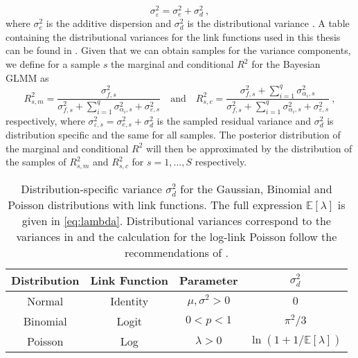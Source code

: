 \begin{equation}
    \sigma_{\varepsilon}^2 = \sigma^2_e + \sigma^2_d \ ,
\end{equation}
where $\sigma^2_e$ is the additive dispersion and $\sigma^2_d$ is the distributional variance \citep{nakagawa2013general}. A table containing the distributional variances for the link functions used in this thesis can be found in . Given that we can obtain samples for the variance components, we define for a sample $s$ the marginal and conditional $R^2$ for the Bayesian GLMM as
\begin{equation}
    \label{eq:R2_Bayes_GLMM}
    R^2_{s, m} = \frac{\sigma_{f, s}^2}{\sigma_{f, s}^2 + \sum_{i=1}^q \sigma_{\alpha_i, s}^2 + \sigma_{\varepsilon, s}^2} \quad \text{and} \quad R^2_{s, c} = \frac{\sigma_{f, s}^2 + \sum_{i=1}^q \sigma_{\alpha_i, s}^2}{\sigma_{f, s}^2 + \sum_{i=1}^q \sigma_{\alpha_i, s}^2 + \sigma_{\varepsilon, s}^2} \ ,
\end{equation}
respectively, where $\sigma_{\varepsilon, s}^2 = \sigma^2_{e, s} + \sigma^2_d$ is the sampled residual variance and $\sigma^2_d$ is distribution specific and the same for all samples. The posterior distribution of the marginal and conditional $R^2$ will then be approximated by the distribution of the samples of $R^2_{s, m}$ and $R^2_{s, c}$ for $s=1, ..., S$ respectively.

\begin{table}[h]
    \centering
    \begin{tabular}{|c|c|c|c|}
    \hline
    \textbf{Distribution} &  \textbf{Link Function} & \textbf{Parameter} & \(\sigma^2_d\) \\
    \hline
    Normal & Identity & $\mu, \sigma^2 > 0$ & $0$ \\
    \hline
    Binomial & Logit & $0<p<1$ & \(\pi^2/3\) \\
    \hline
    Poisson & Log & $\lambda>0$ & $\ln(1 + 1/\mathbb{E}[\lambda])$ \\%
    \hline
    \end{tabular}
    \caption[Distribution-specific variance \(\sigma^2_d\) for the Gaussian, Binomial and Poisson distributions]{Distribution-specific variance \(\sigma^2_d\) for the Gaussian, Binomial and Poisson distributions with link functions. The full expression $\mathbb{E}[\lambda]$ is given in \eqref{eq:lambda}. Distributional variances correspond to the variances in \citet{nakagawa2013general} and the calculation for the log-link Poisson follow the recommendations of \citet{nakagawa2017}.}
    \label{table:1}
\end{table}


